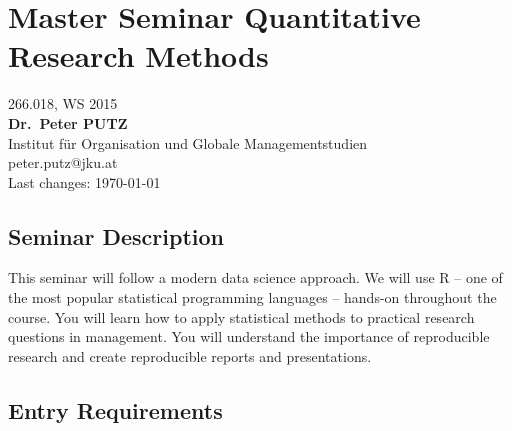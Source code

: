 \documentclass[]{article}
\author{}
\date{}
\begin{document}

\centering

\section{Master Seminar Quantitative Research
Methods}\label{master-seminar-quantitative-research-methods}

266.018, WS 2015\\\textbf{Dr.~Peter PUTZ}\\Institut für Organisation und
Globale Managementstudien\\peter.putz@jku.at\\Last changes: \today

\raggedright

\subsection{Seminar Description}\label{seminar-description}

This seminar will follow a modern data science approach. We will use R
-- one of the most popular statistical programming languages -- hands-on
throughout the course. You will learn how to apply statistical methods
to practical research questions in management. You will understand the
importance of reproducible research and create reproducible reports and
presentations.

\subsection{Entry Requirements}\label{entry-requirements}
\end{document}
